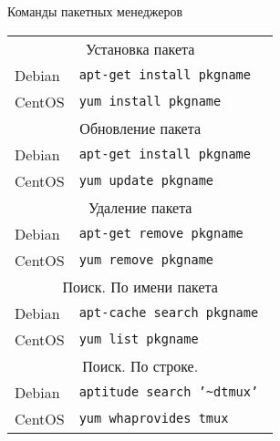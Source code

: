 \begin{frame}{Команды пакетных менеджеров}
        \begin{tabular}{ll}
            \multicolumn{2}{c}{Установка пакета }   \tabularnewline
            Debian & {\tt apt-get \alert{install} pkgname } \\
            CentOS & {\tt yum \alert{install} pkgname } \\
            \multicolumn{2}{c}{Обновление пакета }  \tabularnewline
            Debian & {\tt apt-get \alert{install} pkgname } \\
            CentOS & {\tt yum \alert{update} pkgname }  \\
            \multicolumn{2}{c}{Удаление пакета }   \tabularnewline
            Debian & {\tt apt-get \alert{remove} pkgname } \\ 
            CentOS & {\tt yum \alert{remove} pkgname }  \\
            \multicolumn{2}{c}{Поиск. По имени пакета}   \tabularnewline
            Debian & {\tt apt-cache \alert{search} pkgname } \\
            CentOS & {\tt yum \alert{list} pkgname }  \\
            \multicolumn{2}{c}{Поиск. По строке.}   \tabularnewline
            Debian & {\tt aptitude \alert{search} '\alert{\textasciitilde d}tmux' } \\
            CentOS & {\tt yum \alert{whaprovides} tmux} 
        \end{tabular}
\end{frame}
